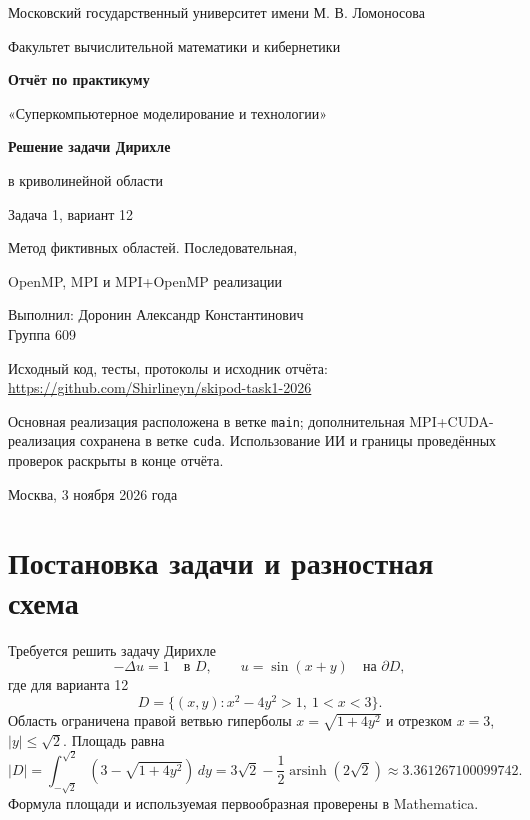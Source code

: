 \documentclass[11pt,a4paper]{article}
\begin{document}
\begin{titlepage}
\centering
{\large Московский государственный университет имени М. В. Ломоносова\par}
\vspace{0.3cm}
{\large Факультет вычислительной математики и кибернетики\par}
\vspace{2.2cm}
{\Large\bfseries Отчёт по практикуму\par}
\vspace{0.5cm}
{\Large «Суперкомпьютерное моделирование и технологии»\par}
\vspace{0.9cm}
{\LARGE\bfseries Решение задачи Дирихле\par в криволинейной области\par}
\vspace{0.7cm}
{\large Задача 1, вариант 12\par}
{\large Метод фиктивных областей. Последовательная,\par OpenMP, MPI и MPI+OpenMP реализации\par}
\vspace{1.7cm}
\begin{flushright}
Выполнил: Доронин Александр Константинович\\
Группа 609
\end{flushright}
\vfill
\begin{minipage}{0.94\textwidth}
\small
Исходный код, тесты, протоколы и исходник отчёта:\\
\url{https://github.com/Shirlineyn/skipod-task1-2026}

Основная реализация расположена в ветке \texttt{main}; дополнительная
MPI+CUDA-реализация сохранена в ветке \texttt{cuda}. Использование ИИ и
границы проведённых проверок раскрыты в конце отчёта.
\end{minipage}
\vspace{1cm}

Москва, 3 ноября 2026 года
\end{titlepage}

\section{Постановка задачи и разностная схема}
Требуется решить задачу Дирихле
\begin{equation}
-\Delta u=1\quad\text{в }D,\qquad u=\sin(x+y)\quad\text{на }\partial D,
\end{equation}
где для варианта 12
\[
D=\{(x,y):x^2-4y^2>1,\ 1<x<3\}.
\]
Область ограничена правой ветвью гиперболы $x=\sqrt{1+4y^2}$ и отрезком
$x=3$, $|y|\leq\sqrt2$. Площадь равна
\[
|D|=\int_{-\sqrt2}^{\sqrt2}\left(3-\sqrt{1+4y^2}\right)\,dy
=3\sqrt2-\frac12\operatorname{arsinh}(2\sqrt2)
\approx3.361267100099742.
\]
Формула площади и используемая первообразная проверены в Mathematica.
\end{document}
